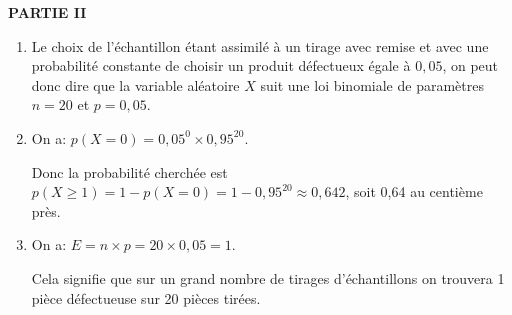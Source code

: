 \documentclass[10pt]{article}
\begin{document}
\textbf{PARTIE II}

\medskip







\begin{enumerate}
\item 
Le choix de l'échantillon étant assimilé à un tirage avec remise et avec une probabilité constante de choisir un produit défectueux égale à $ 0,05$, on peut donc dire que la variable aléatoire $X$ suit une loi binomiale de paramètres $n = 20$ et $p  = 0,05$.
\item 


On a: $p(X = 0) = 0,05^0 \times 0,95^{20}$.

Donc la probabilité cherchée est $p(X \geqslant 1) = 1 -p(X =0) = 1 - 0,95^{20} \approx 0,642$, soit 0,64 au centième près.
\item 
On a: $E = n \times p = 20 \times 0,05 = 1$.

Cela signifie que sur un grand nombre de tirages d'échantillons on trouvera 1 pièce défectueuse sur 20 pièces tirées.
\end{enumerate}

\vspace{0,5cm}
\end{document}

